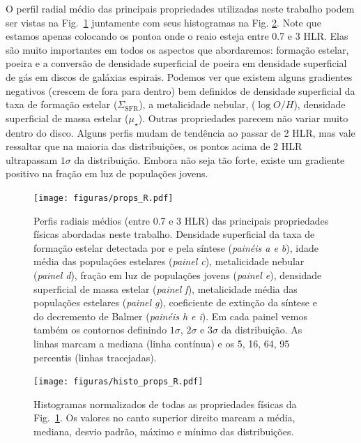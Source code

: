 O perfil radial médio das principais propriedades utilizadas neste trabalho podem ser vistas na
Fig.\ \ref{fig:RadProfProps} juntamente com seus histogramas na Fig. \ref{fig:HistoRadProfProps}.
Note que estamos apenas colocando os pontoa onde o reaio esteja entre 0.7 e 3 HLR. Elas são muito
importantes em todos os aspectos que abordaremos: formação estelar, poeira e a conversão de
densidade superficial de poeira em densidade superficial de gás em discos de galáxias espirais.
Podemos ver que existem alguns gradientes negativos (crescem de fora para dentro) bem definidos de
densidade superficial da taxa de formação estelar ($\Sigma_{\mathrm{SFR}}$), a metalicidade nebular,
($\log O/H$), densidade superficial de massa estelar ($\mu_\star$). Outras propriedades parecem não
variar muito dentro do disco. Alguns perfis mudam de tendência ao passar de 2 HLR, mas vale
ressaltar que na maioria das distribuições, os pontos acima de 2 HLR ultrapassam $1\sigma$ da
distribuição. Embora não seja tão forte, existe um gradiente positivo na fração em luz de populações
jovens.

\begin{figure}
	\centering
	\texttt{[image: figuras/props\_R.pdf]}
	\caption[Perfis radiais das propriedades físicas]
	{Perfis radiais médios (entre 0.7 e 3 HLR) das principais propriedades físicas abordadas neste
trabalho. Densidade superficial da taxa de formação estelar detectada por \Halpha e pela síntese
({\em painéis a e b}), idade média das populações estelares ({\em painel c}), metalicidade nebular
({\em painel d}), fração em luz de populações jovens ({\em painel e}), densidade superficial de
massa estelar ({\em painel f}), metalicidade média das populações estelares ({\em painel g}),
coeficiente de extinção da síntese e do decremento de Balmer ({\em painéis h e i}). Em cada painel
vemos também os contornos definindo $1\sigma$, $2\sigma$ e $3\sigma$ da distribuição. As linhas
marcam a mediana (linha contínua) e os 5, 16, 64, 95 percentis (linhas tracejadas).}
	\label{fig:RadProfProps}
\end{figure}

\begin{figure}
	\centering
	\texttt{[image: figuras/histo\_props\_R.pdf]}
	\caption[Histogramas dos perfis radiais das propriedades físicas]
	{Histogramas normalizados de todas as propriedades físicas da Fig.\ \ref{fig:RadProfProps}. Os
valores no canto superior direito marcam a média, mediana, desvio padrão, máximo e mínimo das
distribuições.}
	\label{fig:HistoRadProfProps}
\end{figure}

